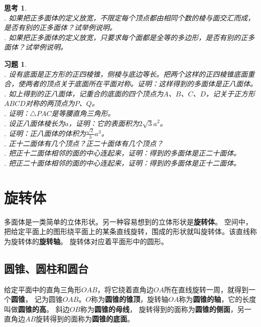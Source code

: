 \documentclass[12pt,UTF8]{ctexbook}
\newtheorem{sk}{思考}[section]
\newtheorem{xt}{习题}[section]
\begin{document}
\begin{sk}
    \mbox{}\\
    . 如果把正多面体的定义放宽，不限定每个顶点都由相同个数的棱与面交汇而成，是否有别的正多面体？试举例说明。\\
    . 如果把正多面体的定义放宽，只要求每个面都是全等的多边形，是否有别的正多面体？试举例说明。
\end{sk}

\begin{xt}
    \mbox{}\\
    . 设有底面是正方形的正四棱锥，侧棱与底边等长。把两个这样的正四棱锥底面重合，使两者的顶点关于底面所在平面对称。证明：这样得到的多面体是正八面体。\\
    . 如上得到的正八面体，记重合的底面的四个顶点为$A$、$B$、$C$、$D$，记关于正方形$ABCD$对称的两顶点为$P$、$Q$。\\
    . 证明：$\triangle PAC$是等腰直角三角形。\\
    . 设正八面体棱长为$a$，证明：它的表面积为$2\sqrt{3}a^2$。\\
    . 证明：正八面体的体积为$\frac{\sqrt{2}}{3}a^3$。\\
    . 正十二面体有几个顶点？正二十面体有几个顶点？\\
    . 把正十二面体相邻的面的中心连起来，证明：得到的多面体是正二十面体。\\
    . 把正二十面体相邻的面的中心连起来，证明：得到的多面体是正十二面体。
\end{xt}


\chapter{旋转体}

多面体是一类简单的立体形状。另一种容易想到的立体形状是\textbf{旋转体}。
空间中，把给定平面上的图形绕平面上的某条直线旋转，围成的形状就叫旋转体。该直线称为旋转体的\textbf{旋转轴}。
旋转体对应着平面形中的圆形。

\section{圆锥、圆柱和圆台}

给定平面中的直角三角形$OAB$，将它绕着直角边$OA$所在直线旋转一周，就得到一个\textbf{圆锥}，
记为圆锥$OAB$。$O$称为\textbf{圆锥的锥顶}，旋转轴$OA$称为\textbf{圆锥的轴}，它的长度叫做\textbf{圆锥的高}。
斜边$OB$称为\textbf{圆锥的母线}，
旋转得到的面称为\textbf{圆锥的侧面}，另一直角边$AB$旋转得到的面称为\textbf{圆锥的底面}。
\end{document}
